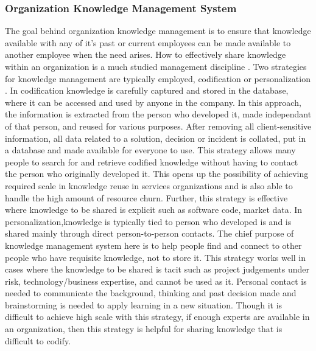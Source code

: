 \subsubsection{Organization Knowledge Management System}

The goal behind organization knowledge management is to ensure that knowledge available with any of it's past or current employees can be made available to another employee when the need arises. How to effectively share knowledge within an organization is a much studied management discipline \cite{}. Two strategies for knowledge management are typically employed, codification or personalization \cite{}. In codification knowledge is carefully captured and stored in the database, where it can be accessed and used by anyone in the company. In this approach, the information is extracted from the person who developed it, made independant of that person, and reused for various purposes. After removing all client-sensitive information, all data related to a solution, decision or incident is collated, put in a database and made available for everyone to use. This strategy allows many people to search for and retrieve codified knowledge without having to contact the person who originally developed it. This opens up the possibility of achieving required scale in knowledge reuse in services organizations and is also able to handle the high amount of resource churn. Further, this strategy is effective where knowledge to be shared is explicit such as software code, market data. In personalization,knowledge is typically tied to person who developed is and is shared mainly through direct person-to-person contacts. The chief purpose of knowledge management system here is to help people find and connect to other people who have requisite knowledge, not to store it. This strategy works well in cases where the knowledge to be shared is tacit such as project judgements under risk, technology/business expertise, and cannot be used as it. Personal contact is needed to communicate the background, thinking and past decision made and brainstorming is needed to apply learning in a new situation. Though it is difficult to achieve high scale with this strategy, if enough experts are available in an organization, then this strategy is helpful for sharing knowledge that is difficult to codify. 

